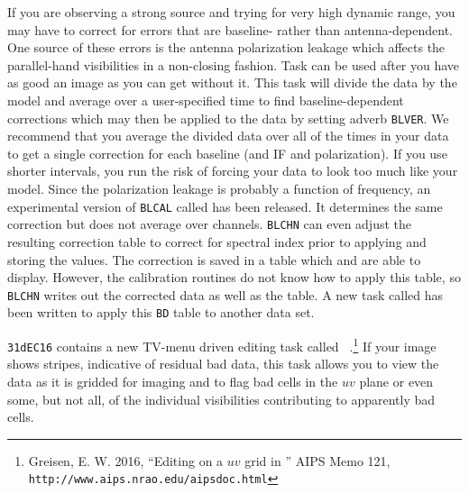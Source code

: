 If you are observing a strong source and trying for very high dynamic
range, you may have to correct for errors that are baseline- rather
than antenna-dependent.  One source of these errors is the antenna
polarization leakage which affects the parallel-hand visibilities in a
non-closing fashion.  Task {\tt {}} can be used after you
have as good an image as you can get without it.  This task will
divide the data by the model and average over a user-specified time to
find baseline-dependent corrections which may then be applied to the
data by setting adverb {\tt BLVER}\@.  We recommend that you average
the divided data over all of the times in your data to get a single
correction for each baseline (and IF and polarization).  If you use
shorter intervals, you run the risk of forcing your data to look too
much like your model.  Since the polarization leakage is probably a
function of frequency, an experimental version of {\tt BLCAL} called
{\tt {}} has been released.  It determines the same
correction but does not average over channels.  {\tt BLCHN} can even
adjust the resulting correction table to correct for spectral index
prior to applying and storing the values.  The correction is saved in
a table which {\tt {}} and {\tt {}} are able to
display.  However, the calibration routines do not know how to apply
this table, so {\tt BLCHN} writes out the corrected data as well as
the table.  A new task called {\tt {}} has been written to
apply this {\tt BD} table to another data set.

{\tt 31dEC16} contains a new TV-menu driven editing task called {\tt
{}}\@.\footnote{Greisen, E. W. 2016, ``Editing on a $uv$
grid in \AIPS'' AIPS Memo 121, {\tt
http://www.aips.nrao.edu/aipsdoc.html}}  If your image shows stripes,
indicative of residual bad data, this task allows you to view the data
as it is gridded for imaging and to flag bad cells in the $uv$ plane
or even some, but not all, of the individual visibilities contributing
to apparently bad cells.




